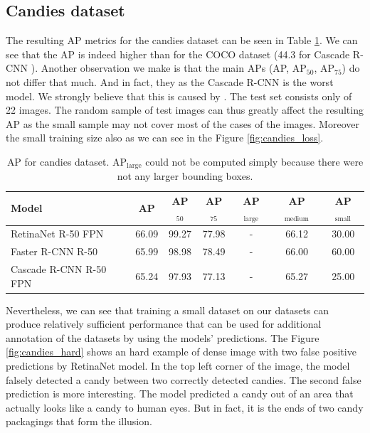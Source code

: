 \subsection*{Candies dataset}
The resulting AP metrics for the candies dataset can be seen in Table
\ref{tab:candies}. We can see that the AP is indeed higher than for the COCO
dataset (44.3 for Cascade R-CNN \cite{detectron}). Another observation we make
is that the main APs (AP, AP$_{50}$, AP$_{75}$) do not differ that much. And
in fact, they  as the Cascade R-CNN is
the worst model. We strongly believe that this is caused by . The test set consists only of 22 images. The random sample of
test images can thus greatly affect the resulting AP as the small sample may not
cover most of the cases of the images. Moreover the small training size also
 as we can see in the Figure \ref{fig:candies_loss}.

\begin{table}[H]
	\centering
	\begin{tabular}{l|c|c|c|c|c|c}
		Model                  & AP    & AP$_{50}$ & AP$_{75}$ & AP$_\text{large}$ & AP$_\text{medium}$ & AP$_\text{small}$ \\
		\hline
		RetinaNet R-50 FPN     & 66.09 & 99.27     & 77.98     & -                 & 66.12              & 30.00             \\
		Faster R-CNN R-50      & 65.99 & 98.98     & 78.49     & -                 & 66.00              & 60.00             \\
		Cascade R-CNN R-50 FPN & 65.24 & 97.93     & 77.13     & -                 & 65.27              & 25.00
	\end{tabular}
	\caption{AP for candies dataset. AP$_\text{large}$ could not be computed
		simply because there were not any larger bounding boxes.}
	\label{tab:candies}
\end{table}

Nevertheless, we can see that training a small dataset on our datasets can
produce relatively sufficient performance that can be used for additional
annotation of the datasets by using the models' predictions. The Figure
\ref{fig:candies_hard} shows an hard example of dense image with two false
positive predictions by RetinaNet model. In the top left corner of the image,
the model falsely detected a candy between two correctly detected candies. The
second false prediction is more interesting. The model predicted a candy out of
an area that actually looks like a candy to human eyes. But in fact, it is
the ends of two candy packagings that form the illusion.

